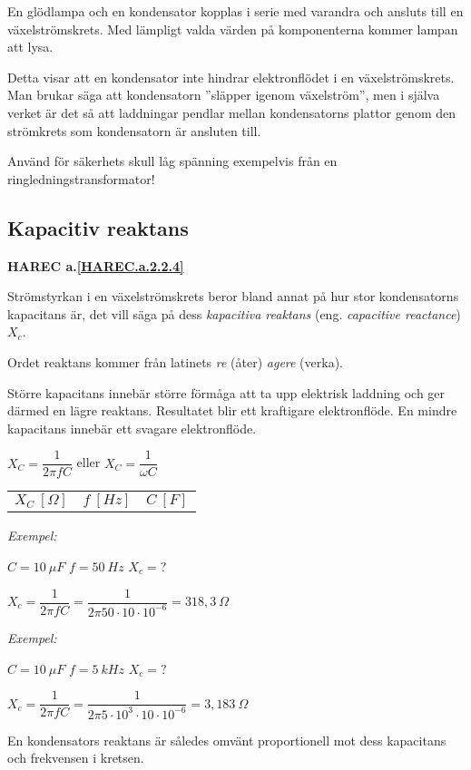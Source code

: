 En glödlampa och en kondensator kopplas i serie med varandra och ansluts till en
växelströmskrets. Med lämpligt valda värden på komponenterna kommer lampan att
lysa.

Detta visar att en kondensator inte hindrar elektronflödet i en växelströmskrets.
Man brukar säga att kondensatorn ''släpper igenom växelström'', men i själva 
verket är det så att laddningar pendlar mellan kondensatorns plattor genom den
strömkrets som kondensatorn är ansluten till.

Använd för säkerhets skull låg spänning exempelvis från en ringledningstransformator!

\subsection{Kapacitiv reaktans}
\textbf{HAREC a.\ref{HAREC.a.2.2.4}\label{myHAREC.a.2.2.4}}

Strömstyrkan i en växelströmskrets beror bland annat på hur stor kondensatorns
kapacitans är, det vill säga på dess \emph{kapacitiva reaktans} (eng.
\emph{capacitive reactance}) \(X_c\).

Ordet reaktans kommer från latinets \emph{re} (åter) \emph{agere} (verka).

Större kapacitans innebär större förmåga att ta upp elektrisk laddning och ger
därmed en lägre reaktans. Resultatet blir ett kraftigare elektronflöde.
En mindre kapacitans innebär ett svagare elektronflöde.

\(X_C = \dfrac{1}{2\pi fC}\) eller \(X_C = \dfrac{1}{\omega C}\)

\begin{tabular}{lll}
\(X_C\ [\Omega]\) & \(f\ [Hz]\) & \(C\ [F]\) 
\end{tabular}

\emph{Exempel:}

\(C = 10\ \mu F\) \(f = 50\ Hz\) \(X_c = ?\)

\(X_c = \dfrac{1}{2\pi fC} = \dfrac{1}{2\pi 50 \cdot 10 \cdot 10^{-6}} = 318,3\ \Omega\)

\emph{Exempel:}

\(C = 10\ \mu F\) \(f = 5\ kHz\) \(X_c = ?\)

\(X_c = \dfrac{1}{2\pi fC} = \dfrac{1}{2\pi 5 \cdot 10^3 \cdot 10 \cdot 10^{-6}}
= 3,183\ \Omega\)

En kondensators reaktans är således omvänt proportionell mot dess kapacitans
och frekvensen i kretsen.

